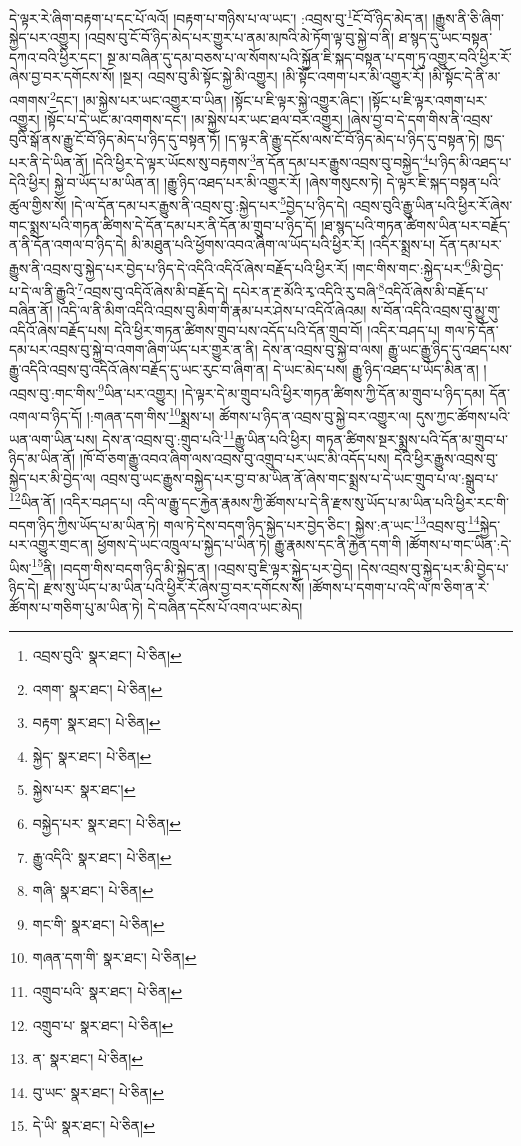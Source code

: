 དེ་ལྟར་རེ་ཞིག་བརྟག་པ་དང་པོ་ལའོ། །བརྟག་པ་གཉིས་པ་ལ་ཡང་། :འབྲས་བུ་\footnote{འབྲས་བུའི་  སྣར་ཐང་།  པེ་ཅིན། }ངོ་བོ་ཉིད་མེད་ན། །རྒྱུས་ནི་ཅི་ཞིག་སྐྱེད་པར་འགྱུར། །འབྲས་བུ་ངོ་བོ་ཉིད་མེད་པར་གྱུར་པ་ནམ་མཁའི་མེ་ཏོག་ལྟ་བུ་སྐྱེ་བ་ནི། ཐ་སྙད་དུ་ཡང་བསྟན་དཀའ་བའི་ཕྱིར་དང་། སྔ་མ་བཞིན་དུ་དམ་བཅས་པ་ལ་སོགས་པའི་སྐྱོན་ཇི་སྐད་བསྟན་པ་དག་ཏུ་འགྱུར་བའི་ཕྱིར་རོ་ཞེས་བྱ་བར་དགོངས་སོ། །སྔར། འབྲས་བུ་མི་སྟོང་སྐྱེ་མི་འགྱུར། །མི་སྟོང་འགག་པར་མི་འགྱུར་རོ། །མི་སྟོང་དེ་ནི་མ་འགགས་\footnote{འགག་  སྣར་ཐང་།  པེ་ཅིན། }དང་། །མ་སྐྱེས་པར་ཡང་འགྱུར་བ་ཡིན། །སྟོང་པ་ཇི་ལྟར་སྐྱེ་འགྱུར་ཞིང་། །སྟོང་པ་ཇི་ལྟར་འགག་པར་འགྱུར། །སྟོང་པ་དེ་ཡང་མ་འགགས་དང་། །མ་སྐྱེས་པར་ཡང་ཐལ་བར་འགྱུར། །ཞེས་བྱ་བ་དེ་དག་གིས་ནི་འབྲས་བུའི་སྒོ་ནས་རྒྱུ་ངོ་བོ་ཉིད་མེད་པ་ཉིད་དུ་བསྟན་ཏོ། །ད་ལྟར་ནི་རྒྱུ་དངོས་ལས་ངོ་བོ་ཉིད་མེད་པ་ཉིད་དུ་བསྟན་ཏེ། ཁྱད་པར་ནི་དེ་ཡིན་ནོ། །དེའི་ཕྱིར་དེ་ལྟར་ཡོངས་སུ་བརྟགས་\footnote{བརྟག་  སྣར་ཐང་།  པེ་ཅིན། }ན་དོན་དམ་པར་རྒྱུས་འབྲས་བུ་བསྐྱེད་\footnote{སྐྱེད་  སྣར་ཐང་།  པེ་ཅིན། }པ་ཉིད་མི་འཐད་པ་དེའི་ཕྱིར། སྐྱེ་བ་ཡོད་པ་མ་ཡིན་ན། །རྒྱུ་ཉིད་འཐད་པར་མི་འགྱུར་རོ། །ཞེས་གསུངས་ཏེ། དེ་ལྟར་ཇི་སྐད་བསྟན་པའི་ཚུལ་གྱིས་སོ། །དེ་ལ་དོན་དམ་པར་རྒྱུས་ནི་འབྲས་བུ་:སྐྱེད་པར་\footnote{སྐྱེས་པར་  སྣར་ཐང་། }བྱེད་པ་ཉིད་དེ། འབྲས་བུའི་རྒྱུ་ཡིན་པའི་ཕྱིར་རོ་ཞེས་གང་སྨྲས་པའི་གཏན་ཚིགས་དེ་དོན་དམ་པར་ནི་དོན་མ་གྲུབ་པ་ཉིད་དོ། །ཐ་སྙད་པའི་གཏན་ཚིགས་ཡིན་པར་བརྗོད་ན་ནི་དོན་འགལ་བ་ཉིད་དེ། མི་མཐུན་པའི་ཕྱོགས་འབའ་ཞིག་ལ་ཡོད་པའི་ཕྱིར་རོ། །འདིར་སྨྲས་པ། དོན་དམ་པར་རྒྱུས་ནི་འབྲས་བུ་སྐྱེད་པར་བྱེད་པ་ཉིད་དེ་འདིའི་འདིའོ་ཞེས་བརྗོད་པའི་ཕྱིར་རོ། །གང་གིས་གང་:སྐྱེད་པར་\footnote{བསྐྱེད་པར་  སྣར་ཐང་།  པེ་ཅིན། }མི་བྱེད་པ་དེ་ལ་ནི་རྒྱུའི་\footnote{རྒྱུ་འདིའི་  སྣར་ཐང་།  པེ་ཅིན། }འབྲས་བུ་འདིའོ་ཞེས་མི་བརྗོད་དེ། དཔེར་ན་རྔ་མོའི་རྭ་འདིའི་རུ་བཞི་\footnote{གཞི་  སྣར་ཐང་།  པེ་ཅིན། }འདིའོ་ཞེས་མི་བརྗོད་པ་བཞིན་ནོ། །འདི་ལ་ནི་མིག་འདིའི་འབྲས་བུ་མིག་གི་རྣམ་པར་ཤེས་པ་འདིའོ་ཞེའམ། ས་བོན་འདིའི་འབྲས་བུ་མྱུ་གུ་འདིའོ་ཞེས་བརྗོད་པས། དེའི་ཕྱིར་གཏན་ཚིགས་གྲུབ་པས་འདོད་པའི་དོན་གྲུབ་བོ། །འདིར་བཤད་པ། གལ་ཏེ་དོན་དམ་པར་འབྲས་བུ་སྐྱེ་བ་འགག་ཞིག་ཡོད་པར་གྱུར་ན་ནི། དེས་ན་འབྲས་བུ་སྐྱེ་བ་ལས། རྒྱུ་ཡང་རྒྱུ་ཉིད་དུ་འཐད་པས་རྒྱུ་འདིའི་འབྲས་བུ་འདིའོ་ཞེས་བརྗོད་དུ་ཡང་རུང་བ་ཞིག་ན། དེ་ཡང་མེད་པས། རྒྱུ་ཉིད་འཐད་པ་ཡོད་མིན་ན། །འབྲས་བུ་:གང་གིས་\footnote{གང་གི་  སྣར་ཐང་།  པེ་ཅིན། }ཡིན་པར་འགྱུར། །དེ་ལྟར་དེ་མ་གྲུབ་པའི་ཕྱིར་གཏན་ཚིགས་ཀྱི་དོན་མ་གྲུབ་པ་ཉིད་དམ། དོན་འགལ་བ་ཉིད་དོ། །:གཞན་དག་གིས་\footnote{གཞན་དག་གི་  སྣར་ཐང་།  པེ་ཅིན། }སྨྲས་པ། ཚོགས་པ་ཉིད་ན་འབྲས་བུ་སྐྱེ་བར་འགྱུར་ལ། དུས་ཀྱང་ཚོགས་པའི་ཡན་ལག་ཡིན་པས། དེས་ན་འབྲས་བུ་:གྲུབ་པའི་\footnote{འགྲུབ་པའི་  སྣར་ཐང་།  པེ་ཅིན། }རྒྱུ་ཡིན་པའི་ཕྱིར། གཏན་ཚིགས་སྔར་སྨྲས་པའི་དོན་མ་གྲུབ་པ་ཉིད་མ་ཡིན་ནོ། །ཁོ་བོ་ཅག་རྒྱུ་འབའ་ཞིག་ལས་འབྲས་བུ་འགྲུབ་པར་ཡང་མི་འདོད་པས། དེའི་ཕྱིར་རྒྱུས་འབྲས་བུ་སྐྱེད་པར་མི་བྱེད་ལ། འབྲས་བུ་ཡང་རྒྱུས་བསྐྱེད་པར་བྱ་བ་མ་ཡིན་ནོ་ཞེས་གང་སྨྲས་པ་དེ་ཡང་གྲུབ་པ་ལ་:སྒྲུབ་པ་\footnote{འགྲུབ་པ་  སྣར་ཐང་།  པེ་ཅིན། }ཡིན་ནོ། །འདིར་བཤད་པ། འདི་ལ་རྒྱུ་དང་རྐྱེན་རྣམས་ཀྱི་ཚོགས་པ་དེ་ནི་རྫས་སུ་ཡོད་པ་མ་ཡིན་པའི་ཕྱིར་རང་གི་བདག་ཉིད་ཀྱིས་ཡོད་པ་མ་ཡིན་ཏེ། གལ་ཏེ་དེས་བདག་ཉིད་སྐྱེད་པར་བྱེད་ཅིང་། སྐྱེས་:ན་ཡང་\footnote{ན་  སྣར་ཐང་།  པེ་ཅིན། }འབྲས་བུ་\footnote{བུ་ཡང་  སྣར་ཐང་།  པེ་ཅིན། }སྐྱེད་པར་འགྱུར་གྲང་ན། ཕྱོགས་དེ་ཡང་འཁྲུལ་པ་སྐྱེད་པ་ཡིན་ཏེ། རྒྱུ་རྣམས་དང་ནི་རྐྱེན་དག་གི །ཚོགས་པ་གང་ཡིན་:དེ་ཡིས་\footnote{དེ་ཡི་  སྣར་ཐང་།  པེ་ཅིན། }ནི། །བདག་གིས་བདག་ཉིད་མི་སྐྱེད་ན། །འབྲས་བུ་ཇི་ལྟར་སྐྱེད་པར་བྱེད། །དེས་འབྲས་བུ་སྐྱེད་པར་མི་བྱེད་པ་ཉིད་དེ། རྫས་སུ་ཡོད་པ་མ་ཡིན་པའི་ཕྱིར་རོ་ཞེས་བྱ་བར་དགོངས་སོ། །ཚོགས་པ་དགག་པ་འདི་ལ་ཁ་ཅིག་ན་རེ་ཚོགས་པ་གཅིག་པུ་མ་ཡིན་ཏེ། དེ་བཞིན་དངོས་པོ་འགའ་ཡང་མེད། 